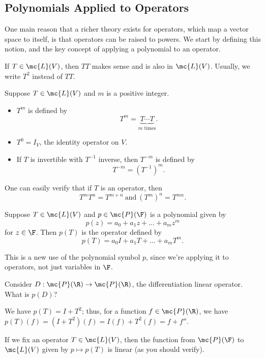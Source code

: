 \documentclass[math0540-lecture-notes.tex]{subfiles}
\begin{document}
\subsection{Polynomials Applied to Operators}

One main reason that a richer theory exists for operators, which map a vector space to itself, is
that operators can be raised to powers. We start by defining this notion, and the key concept of
applying a polynomial to an operator.

If $T\in \mc{L}(V)$, then $TT$ makes sense and is also in $\mc{L}(V)$. Usually, we write $T^2$
instead of $TT$.

\begin{definition}[$T^m$]{}
  Suppose $T\in \mc{L}(V)$ and $m$ is a positive integer.
  \begin{itemize}
    \item $T^m$ is defined by \[
      T^m=\underbrace{T\cdots T}_\text{$m$ times}
    .\] 
  \item $T^0=I_V$, the identity operator on $V$.
  \item If $T$ is invertible with $T^{-1}$ inverse, then $T^{-m}$ is defined by \[
      T^{-m}=(T^{-1})^{m}
  .\] 
  \end{itemize}
\end{definition}

One can easily verify that if $T$ is an operator, then \[
  T^mT^n=T^{m+n} ~\text{and}~ (T^m)^n=T^{mn}
.\] 

\begin{definition}[$p(T)$]{}
  Suppose $T\in \mc{L}(V)$ and $p\in \mc{P}(\F)$ is a polynomial given by \[
    p(z)=a_0+a_1z+\ldots+a_mz^m
  \] for $z\in \F$. Then $p(T)$ is the operator defined by \[
    p(T)=a_0I+a_1T+\ldots+a_mT^m
  .\]
\end{definition}

This is a new use of the polynomial symbol $p$, since we're applying it to operators, not just
variables in $\F$.

\begin{example}
  Consider $D:\mc{P}(\R)\to \mc{P}(\R)$, the differentiation linear operator. What is $p(D)$?

  We have $p(T)=I+T^2$; thus, for a function $f\in \mc{P}(\R)$, we have
  $p(T)(f)=(I+T^2)(f)=I(f)+T^2(f)=f+f''$.
\end{example}


If we fix an operator $T\in \mc{L}(V)$, then the function from $\mc{P}(\F)$ to $\mc{L}(V)$ given by
$p\mapsto p(T)$ is linear (as you should verify).
\end{document}
